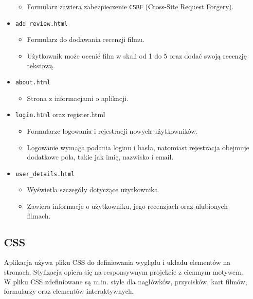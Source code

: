 \documentclass[../main.tex]{subfiles}
\begin{document}
\begin{itemize}
\begin{itemize}
		      \item Formularz zawiera zabezpieczenie \texttt{CSRF} (Cross-Site Request Forgery).
	      \end{itemize}
	\item \texttt{add\_review.html}
	      \begin{itemize}
		      \item Formularz do dodawania recenzji filmu.
		      \item Użytkownik może ocenić film w skali od 1 do 5 oraz dodać swoją recenzję tekstową.
	      \end{itemize}
	\item \texttt{about.html}
	      \begin{itemize}
		      \item Strona z informacjami o aplikacji.
	      \end{itemize}
	\item \texttt{login.html} oraz {register.html}
	      \begin{itemize}
		      \item Formularze logowania i rejestracji nowych użytkowników.
		      \item Logowanie wymaga podania loginu i hasła, natomiast rejestracja obejmuje dodatkowe pola, takie jak imię, nazwisko i email.
	      \end{itemize}
	\item \texttt{user\_details.html}
	      \begin{itemize}
		      \item Wyświetla szczegóły dotyczące użytkownika.
		      \item Zawiera informacje o użytkowniku, jego recenzjach oraz ulubionych filmach.
	      \end{itemize}
\end{itemize}

\subsection{CSS}

\newcommand{\fakesection}[1]{
	\FloatBarrier %
	\vspace{\baselineskip} 
	\noindent \textbf{\large #1}
}

Aplikacja używa pliku CSS do definiowania wyglądu i układu elementów na stronach. Stylizacja opiera się na responsywnym projekcie z ciemnym motywem. W pliku CSS zdefiniowane są m.in. style dla nagłówków, przycisków, kart filmów, formularzy oraz elementów interaktywnych.
\end{document}

